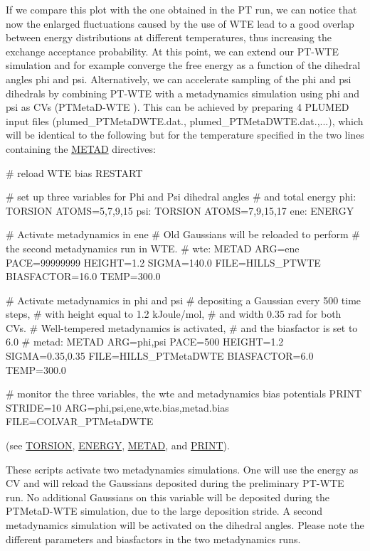 \label{belfast-7_belfast-7-ptwteene-fig}%
\hypertarget{belfast-7_belfast-7-ptwteene-fig}{}%
 If we compare this plot with the one obtained in the P\+T run, we can notice that now the enlarged fluctuations caused by the use of W\+T\+E lead to a good overlap between energy distributions at different temperatures, thus increasing the exchange acceptance probability. At this point, we can extend our P\+T-\/\+W\+T\+E simulation and for example converge the free energy as a function of the dihedral angles phi and psi. Alternatively, we can accelerate sampling of the phi and psi dihedrals by combining P\+T-\/\+W\+T\+E with a metadynamics simulation using phi and psi as C\+Vs (P\+T\+Meta\+D-\/\+W\+T\+E \cite{ct300297t}). This can be achieved by preparing 4 P\+L\+U\+M\+E\+D input files (plumed\+\_\+\+P\+T\+Meta\+D\+W\+T\+E.\+dat., plumed\+\_\+\+P\+T\+Meta\+D\+W\+T\+E.\+dat.,...), which will be identical to the following but for the temperature specified in the two lines containing the \hyperlink{METAD}{M\+E\+T\+A\+D} directives\+:

\begin{DoxyVerb}# reload WTE bias
RESTART

# set up three variables for Phi and Psi dihedral angles
# and total energy
phi: TORSION ATOMS=5,7,9,15
psi: TORSION ATOMS=7,9,15,17
ene: ENERGY

# Activate metadynamics in ene
# Old Gaussians will be reloaded to perform
# the second metadynamics run in WTE.
#
wte: METAD ARG=ene PACE=99999999 HEIGHT=1.2 SIGMA=140.0 FILE=HILLS_PTWTE BIASFACTOR=16.0 TEMP=300.0

# Activate metadynamics in phi and psi
# depositing a Gaussian every 500 time steps,
# with height equal to 1.2 kJoule/mol,
# and width 0.35 rad for both CVs.
# Well-tempered metadynamics is activated,
# and the biasfactor is set to 6.0
#
metad: METAD ARG=phi,psi PACE=500 HEIGHT=1.2 SIGMA=0.35,0.35 FILE=HILLS_PTMetaDWTE BIASFACTOR=6.0 TEMP=300.0

# monitor the three variables, the wte and metadynamics bias potentials
PRINT STRIDE=10 ARG=phi,psi,ene,wte.bias,metad.bias FILE=COLVAR_PTMetaDWTE\end{DoxyVerb}
 (see \hyperlink{TORSION}{T\+O\+R\+S\+I\+O\+N}, \hyperlink{ENERGY}{E\+N\+E\+R\+G\+Y}, \hyperlink{METAD}{M\+E\+T\+A\+D}, and \hyperlink{PRINT}{P\+R\+I\+N\+T}).

These scripts activate two metadynamics simulations. One will use the energy as C\+V and will reload the Gaussians deposited during the preliminary P\+T-\/\+W\+T\+E run. No additional Gaussians on this variable will be deposited during the P\+T\+Meta\+D-\/\+W\+T\+E simulation, due to the large deposition stride. A second metadynamics simulation will be activated on the dihedral angles. Please note the different parameters and biasfactors in the two metadynamics runs.

